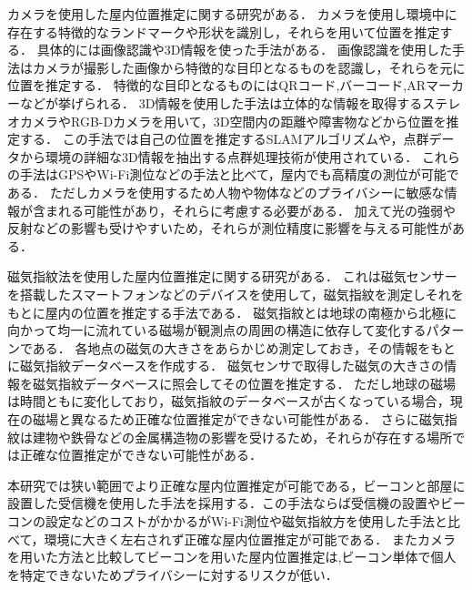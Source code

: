 カメラを使用した屋内位置推定に関する研究がある\cite{camera0}\cite{camera1}．
カメラを使用し環境中に存在する特徴的なランドマークや形状を識別し，それらを用いて位置を推定する．
具体的には画像認識や3D情報を使った手法がある．
画像認識を使用した手法はカメラが撮影した画像から特徴的な目印となるものを認識し，それらを元に位置を推定する．
特徴的な目印となるものにはQRコード,バーコード,ARマーカーなどが挙げられる．
3D情報を使用した手法は立体的な情報を取得するステレオカメラやRGB-Dカメラを用いて，3D空間内の距離や障害物などから位置を推定する．
この手法では自己の位置を推定するSLAMアルゴリズムや，点群データから環境の詳細な3D情報を抽出する点群処理技術が使用されている．
これらの手法はGPSやWi-Fi測位などの手法と比べて，屋内でも高精度の測位が可能である．
ただしカメラを使用するため人物や物体などのプライバシーに敏感な情報が含まれる可能性があり，それらに考慮する必要がある．
加えて光の強弱や反射などの影響も受けやすいため，それらが測位精度に影響を与える可能性がある．



磁気指紋法を使用した屋内位置推定に関する研究がある\cite{magnetic0}\cite{magnetic1}．
これは磁気センサーを搭載したスマートフォンなどのデバイスを使用して，磁気指紋を測定しそれをもとに屋内の位置を推定する手法である．
磁気指紋とは地球の南極から北極に向かって均一に流れている磁場が観測点の周囲の構造に依存して変化するパターンである．
各地点の磁気の大きさをあらかじめ測定しておき，その情報をもとに磁気指紋データベースを作成する．
磁気センサで取得した磁気の大きさの情報を磁気指紋データベースに照会してその位置を推定する．
ただし地球の磁場は時間ともに変化しており，磁気指紋のデータベースが古くなっている場合，現在の磁場と異なるため正確な位置推定ができない可能性がある．
さらに磁気指紋は建物や鉄骨などの金属構造物の影響を受けるため，それらが存在する場所では正確な位置推定ができない可能性がある．


本研究では狭い範囲でより正確な屋内位置推定が可能である，ビーコンと部屋に設置した受信機を使用した手法を採用する．この手法ならば受信機の設置やビーコンの設定などのコストがかかるがWi-Fi測位や磁気指紋方を使用した手法と比べて，環境に大きく左右されず正確な屋内位置推定が可能である．
またカメラを用いた方法と比較してビーコンを用いた屋内位置推定は,ビーコン単体で個人を特定できないためプライバシーに対するリスクが低い．

















